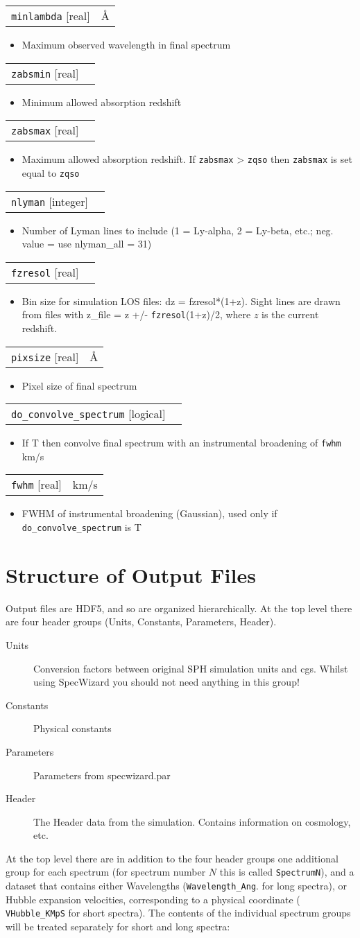 \documentclass{report}
\makeatletter
\newcommand{\paramdefinition}[3]{
\begin{tabular*}{\textwidth}{l@{\extracolsep{\fill}}r}
		{\tt #1} [{\sc #2}]& #3 \\
\end{tabular*}}
\newcommand{\paramdescription}[1]{
\begin{itemize}
\item #1
\end{itemize}\vspace{0.2cm}}
\makeatother
\begin{document}
\paramdefinition{minlambda}{real}{\AA{}}
\paramdescription{Maximum observed wavelength in final spectrum}

\paramdefinition{zabsmin}{real}{}
\paramdescription{Minimum allowed absorption redshift}

\paramdefinition{zabsmax}{real}{}
\paramdescription{Maximum allowed absorption redshift.  If {\tt zabsmax} > {\tt zqso} then {\tt zabsmax} is set equal to {\tt zqso}}

\paramdefinition{nlyman}{integer}{}
\paramdescription{Number of Lyman lines to include (1 = Ly-alpha, 2 = Ly-beta, etc.; neg. value = use nlyman\_all = 31)}

\paramdefinition{fzresol}{real}{}
\paramdescription{Bin size for simulation LOS files: dz = fzresol*(1+z). Sight lines are drawn from files with z\_file = z +/- {\tt fzresol}(1+z)/2, where $z$ is the current redshift.}

\paramdefinition{pixsize}{real}{\AA{}}
\paramdescription{Pixel size of final spectrum}

\paramdefinition{do\_convolve\_spectrum}{logical}{}
\paramdescription{If T then convolve final spectrum with an instrumental broadening of {\tt fwhm} km/s}

\paramdefinition{fwhm}{real}{km/s}
\paramdescription{FWHM of instrumental broadening (Gaussian), used only if {\tt do\_convolve\_spectrum} is T}


\chapter{Structure of Output Files}

Output files are HDF5, and so are organized hierarchically.  At the top level there are four header groups (Units, Constants, Parameters, Header).

\begin{description}
   \item[Units] Conversion factors between original SPH simulation units and cgs.  Whilst using SpecWizard you should not need anything in this group!
   \item[Constants] Physical constants
   \item[Parameters] Parameters from specwizard.par
   \item[Header] The Header data from the simulation.  Contains information on cosmology, etc.
\end{description}  

At the top level there are in addition to the four header groups one
additional group for each spectrum (for spectrum number $N$ this is
called {\tt SpectrumN}), and a dataset that contains either
Wavelengths ({\tt Wavelength\_Ang}. for long spectra), or Hubble
expansion velocities, corresponding to a physical coordinate ({\tt
  VHubble\_KMpS} for short spectra).  The contents of the individual
spectrum groups will be treated separately for short and long spectra:
\end{document}

